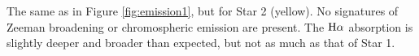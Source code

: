 \label{fig:emission2} The same as in Figure \ref{fig:emission1}, but for Star 2 (yellow). No signatures of Zeeman broadening or chromospheric emission are present. The $\rm{H}\alpha$ absorption is slightly deeper and broader than expected, but not as much as that of Star 1.
